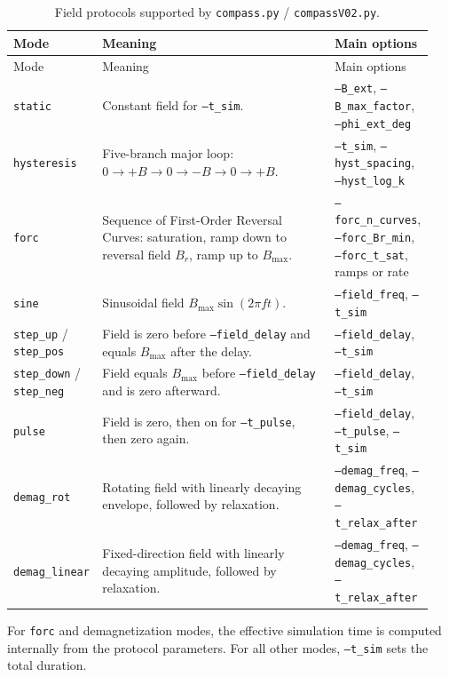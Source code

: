 \documentclass[11pt,a4paper]{article}
\newcommand{\code}[1]{\texttt{#1}}
\begin{document}
\begin{longtable}{p{0.19\linewidth}p{0.55\linewidth}p{0.20\linewidth}}
\caption{Field protocols supported by \code{compass.py} / \code{compassV02.py}.}\label{tab:field_protocols}\\
\toprule
Mode & Meaning & Main options \\
\midrule
\endfirsthead
\toprule
Mode & Meaning & Main options \\
\midrule
\endhead
\code{static} & Constant field for \code{--t\_sim}. & \code{--B\_ext}, \code{--B\_max\_factor}, \code{--phi\_ext\_deg} \\
\code{hysteresis} & Five-branch major loop: $0\to+B\to0\to-B\to0\to+B$. & \code{--t\_sim}, \code{--hyst\_spacing}, \code{--hyst\_log\_k} \\
\code{forc} & Sequence of First-Order Reversal Curves: saturation, ramp down to reversal field $B_r$, ramp up to $B_{\max}$. & \code{--forc\_n\_curves}, \code{--forc\_Br\_min}, \code{--forc\_t\_sat}, ramps or rate \\
\code{sine} & Sinusoidal field $B_{\max}\sin(2\pi f t)$. & \code{--field\_freq}, \code{--t\_sim} \\
\code{step\_up} / \code{step\_pos} & Field is zero before \code{--field\_delay} and equals $B_{\max}$ after the delay. & \code{--field\_delay}, \code{--t\_sim} \\
\code{step\_down} / \code{step\_neg} & Field equals $B_{\max}$ before \code{--field\_delay} and is zero afterward. & \code{--field\_delay}, \code{--t\_sim} \\
\code{pulse} & Field is zero, then on for \code{--t\_pulse}, then zero again. & \code{--field\_delay}, \code{--t\_pulse}, \code{--t\_sim} \\
\code{demag\_rot} & Rotating field with linearly decaying envelope, followed by relaxation. & \code{--demag\_freq}, \code{--demag\_cycles}, \code{--t\_relax\_after} \\
\code{demag\_linear} & Fixed-direction field with linearly decaying amplitude, followed by relaxation. & \code{--demag\_freq}, \code{--demag\_cycles}, \code{--t\_relax\_after} \\
\bottomrule
\end{longtable}

For \code{forc} and demagnetization modes, the effective simulation time is computed internally from the protocol parameters. For all other modes, \code{--t\_sim} sets the total duration.

\end{document}
